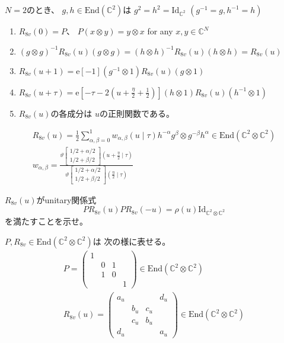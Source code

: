 \documentclass[12pt,b5paper]{ltjsarticle}
\begin{document}
\hrulefill

$N=2$のとき、
$g,h\in\mathrm{End}(\mathbb{C}^{2})$は
$g^{2}=h^{2}=\mathrm{Id}_{\mathbb{C}^{2}}$
 $(g^{-1} = g, h^{-1}=h)$
 \begin{enumerate}
  \item
       $R_{8v}(0)=P$、
       $P(x\otimes y)=y\otimes x$ for any $x,y\in \mathbb{C}^{N}$
  \item
       $(g\otimes g)^{-1}R_{8v}(u)(g\otimes g)
       =(h\otimes h)^{-1}R_{8v}(u)(h\otimes h)
       =R_{8v}(u)$
  \item
       $R_{8v}(u+1)=\mathrm{e}[-1](g^{-1}\otimes 1)R_{8v}(u)(g\otimes 1)$
  \item
       $R_{8v}(u+\tau)
       =\mathrm{e}[-\tau-2(u+\frac{\eta}{2}+\frac{1}{2})]
       (h\otimes 1)R_{8v}(u)(h^{-1}\otimes 1)$
  \item
       $R_{8v}(u)$の各成分は
       $u$の正則関数である。
 \end{enumerate}

 \dotfill

 \begin{gather}
  R_{8v}(u)
  = \frac{1}{2}\sum_{\alpha,\beta=0}^{1} w_{\alpha,\beta}(u\mid \tau)
  h^{-\alpha}g^{\beta} \otimes g^{-\beta} h^{\alpha}
  \in \mathrm{End}(\mathbb{C}^{2}\otimes \mathbb{C}^{2})
  \\
  w_{\alpha,\beta}
  =\frac{\vartheta\begin{bmatrix}1/2+\alpha/2 \\ 1/2+\beta/2\end{bmatrix} (u+\frac{\eta}{2} \mid \tau)}
  {\vartheta\begin{bmatrix}1/2+\alpha/2 \\ 1/2+\beta/2\end{bmatrix} (\frac{\eta}{2} \mid \tau)}
 \end{gather}

\hrulefill

$R_{8v}(u)$がunitary関係式
\begin{equation}
 P R_{8v}(u) P R_{8v}(-u)
  = \rho(u) \mathrm{Id}_{\mathbb{C}^{2}\otimes \mathbb{C}^{2}}
\end{equation}
を満たすことを示せ。

\dotfill

$P,R_{8v} \in \mathrm{End}(\mathbb{C}^{2}\otimes \mathbb{C}^{2})$は
次の様に表せる。
\begin{gather}
 P = \begin{pmatrix}1 &&& \\ &0&1&\\  &1&0&\\  &&&1 \end{pmatrix}
 \in \mathrm{End}(\mathbb{C}^{2}\otimes \mathbb{C}^{2})
 \\
 R_{8v}(u)=
  \begin{pmatrix} a_{u} &&& d_{u} \\ &b_{u}&c_{u}&\\  &c_{u}&b_{u}&\\ d_{u}&&&a_{u} \end{pmatrix}
  \in \mathrm{End}(\mathbb{C}^{2}\otimes \mathbb{C}^{2})
\end{gather}
\end{document}
